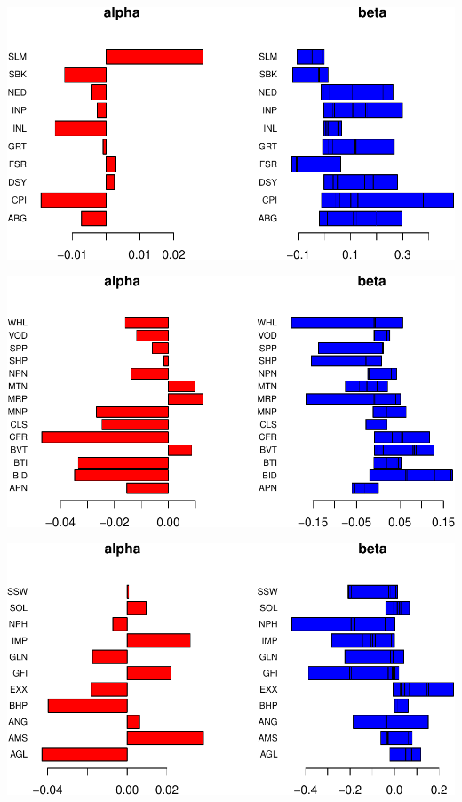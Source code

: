 \documentclass[11pt,preprint, authoryear]{elsarticle}
\let\origfigure\figure
\let\endorigfigure\endfigure
\renewenvironment{figure}[1][2] {
    \expandafter\origfigure\expandafter[H]
} {
    \endorigfigure
}
\numberwithin{equation}{section}
\numberwithin{figure}{section}
\numberwithin{table}{section}
\begin{document}
\begin{figure}[H]
\includegraphics{Factor-Model_files/figure-latex/unnamed-chunk-12-1} \caption{Factor Analysis: Financials \label{Fig10}}\label{fig:unnamed-chunk-12}
\end{figure}

\begin{figure}[H]
\includegraphics{Factor-Model_files/figure-latex/unnamed-chunk-13-1} \caption{Factor Analysis: Industrial \label{Fig11}}\label{fig:unnamed-chunk-13}
\end{figure}

\begin{figure}[H]
\includegraphics{Factor-Model_files/figure-latex/unnamed-chunk-14-1} \caption{Factor Analysis: Resources \label{Fig12}}\label{fig:unnamed-chunk-14}
\end{figure}
\end{document}
